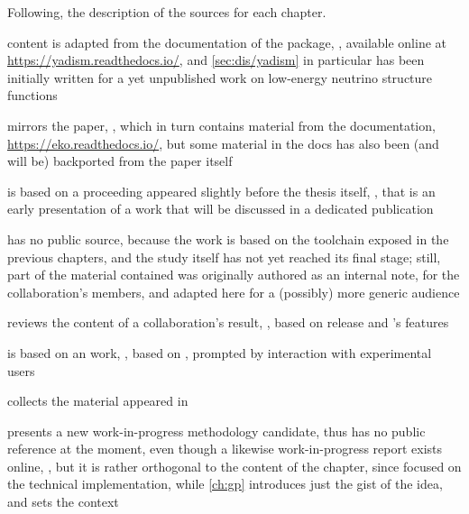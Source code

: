 Following, the description of the sources for each chapter.
\begin{description}[font=\normalfont\sffamily\scshape,leftmargin=2cm,style=nextline]
  \item[\cref{ch:dis}] content is adapted from the documentation of the \yadism
    package, \cite{candido_alessandro_2022_6285149}, available online at
    \url{https://yadism.readthedocs.io/}, and \cref{sec:dis/yadism} in
    particular has been initially written for a yet unpublished work on
    low-energy neutrino structure functions
  \item[\cref{ch:eko}]  mirrors the \eko paper, \cite{Candido:2022tld}, which
    in turn contains material from the \eko documentation,
    \url{https://eko.readthedocs.io/}, but some material in the docs has also
    been (and will be) backported from the paper itself
  \item[\cref{ch:pine}] is based on a proceeding appeared slightly before the
    thesis itself, \cite{Barontini:2022jci}, that is an early presentation of a
    work that will be discussed in a dedicated publication
  \item[\cref{ch:mhou}] has no public source, because the work is based on the
    toolchain exposed in the previous chapters, and the study itself has not
    yet reached its final stage; still, part of the material contained was
    originally authored as an internal note, for the \nnpdf collaboration's
    members, and adapted here for a (possibly) more generic audience
  \item[\cref{ch:ic}] reviews the content of a collaboration's result,
    \cite{Ball:2022qks}, based on  release and \eko's features
  \item[\cref{ch:afb}] is based on an \nnpdf work, \cite{Ball:2022qtp}, based
    on , prompted by interaction with experimental users
  \item[\cref{ch:pos}] collects the material appeared in \cite{Candido:2020yat}
  \item[\cref{ch:gp}] presents a new work-in-progress methodology candidate,
    thus has no public reference at the moment, even though a likewise
    work-in-progress report exists online, \cite{petrillo2022}, but it is
    rather orthogonal to the content of the chapter, since focused on the
    technical implementation, while \cref{ch:gp} introduces just the gist of
    the idea, and sets the context
\end{description}
